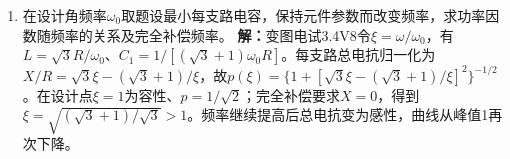 \documentclass[UTF8,fontset=fandol,a4paper,11pt]{ctexart}
\begin{document}
\begin{enumerate}
\item 在设计角频率$\omega_0$取题设最小每支路电容，保持元件参数而改变频率，求功率因数随频率的关系及完全补偿频率。
\textbf{解：}变图电试3.4V8令$\xi=\omega/\omega_0$，有$L=\sqrt3R/\omega_0$、$C_1=1/[(\sqrt3+1)\omega_0R]$。每支路总电抗归一化为$X/R=\sqrt3\xi-(\sqrt3+1)/\xi$，故$p(\xi)=\{1+[\sqrt3\xi-(\sqrt3+1)/\xi]^2\}^{-1/2}$。在设计点$\xi=1$为容性、$p=1/\sqrt2$；完全补偿要求$X=0$，得到$\xi=\sqrt{(\sqrt3+1)/\sqrt3}>1$。频率继续提高后总电抗变为感性，曲线从峰值1再次下降。
\begin{center}\begin{minipage}{.98\linewidth}\centering
{}
\end{minipage}
\end{center}
\end{enumerate}
\end{document}
